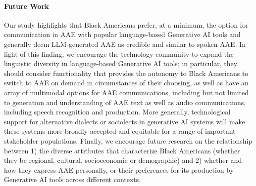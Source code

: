\paragraph{Future Work}
Our study highlights that Black Americans prefer, at a minimum, the option for communication in AAE with popular language-based Generative AI tools and generally deem LLM-generated AAE as credible and similar to spoken AAE. In light of this finding, we encourage the technology community to expand the linguistic diversity in language-based Generative AI tools; in particular, they should consider functionality that provides the autonomy to Black Americans to switch to AAE on demand in circumstances of their choosing, as well as have an array of multimodal options for AAE communications, including but not limited to generation and understanding of AAE text as well as audio communications, including speech recognition and production. More generally, technological support for alternative dialects or sociolects in generative AI systems will make these systems more broadly accepted and equitable for a range of important stakeholder populations. Finally, we encourage future research on the relationship between 1) the diverse attributes that characterize Black Americans (whether they be regional, cultural, socioeconomic or demographic) and 2) whether and how they express AAE personally, or their preferences for its production by Generative AI tools across different contexts.